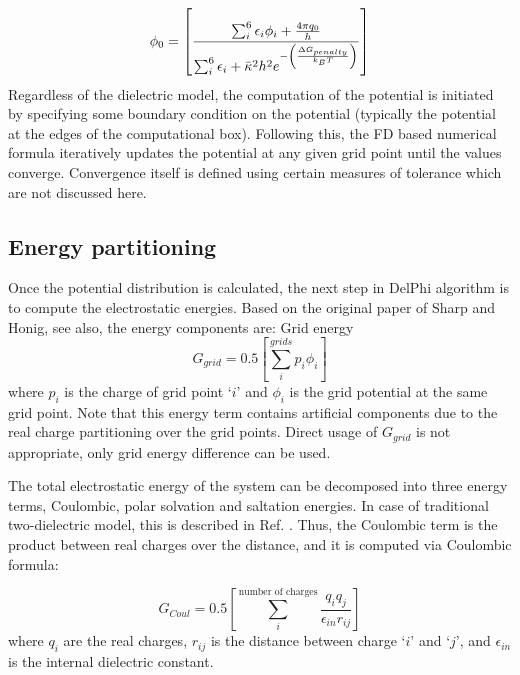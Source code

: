 \documentclass[9pt,tutorial,pubversion]{livecoms}
\begin{document}
\begin{equation}
    \phi_0 = 
    \left[ 
        \frac{\sum_i^6{\epsilon_i\phi_i } + 
                \frac{4\pi q_0}{h}
             }
             {\sum_i^6{\epsilon_i} + \Bar{\kappa}^2h^2e^{-\left(\frac{\Delta G_{penalty}}{k_BT}\right)}}
    \right]
\end{equation}
Regardless of the dielectric model, the computation of the potential is initiated by specifying  some boundary condition on the potential (typically the potential at the edges of the computational box). Following this, the FD based numerical formula iteratively updates the potential at any given grid point until the values converge. Convergence itself is defined using certain measures of tolerance which are not discussed here. 
 
\subsection{Energy partitioning}
Once the potential distribution is calculated, the next step in DelPhi algorithm is to compute the electrostatic energies. Based on the original paper of Sharp and Honig\cite{sharp1990electrostatic}, see also\cite{rocchia2001extending}, the energy components are:
Grid energy
\begin{equation}
    G_{grid} = 0.5 \left[ \sum_i^{grids}{p_i\phi_i} \right]
\end{equation}
where $ p_i $ is the charge of grid point `$ i $' and $ \phi_i $ is the grid potential at the same grid point. Note that this energy term contains artificial components due to the real charge partitioning over the grid points. Direct usage of $ G_{grid} $ is not appropriate, only grid energy difference can be used.

The total electrostatic energy of the system can be decomposed into three energy terms\cite{rocchia2001extending}, Coulombic, polar solvation and saltation energies. In case of traditional two-dielectric model, this is described in Ref. \cite{rocchia2001extending}. Thus, the Coulombic term is the product between real charges over the distance, and it is computed via Coulombic formula:

\begin{equation}
    G_{Coul} = 0.5 \left[ \sum_i^{\text{number of charges}}{\frac{q_i q_j}{\epsilon_{in}r_{ij}}} \right]
\end{equation}	
where $ q_i $ are the real charges, $r_{ij} $ is the distance between charge `$i$' and `$j$', and $ \epsilon_{in} $ is the internal dielectric constant. 
\end{document}
